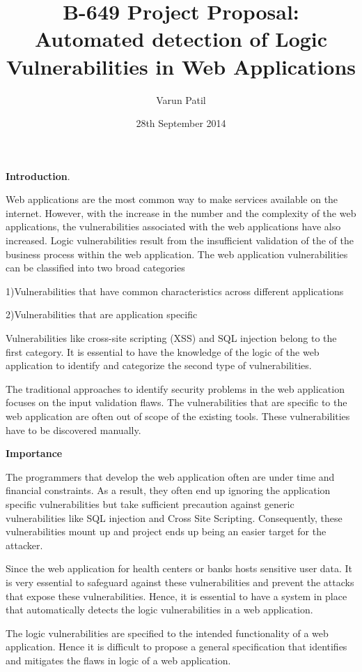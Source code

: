 \documentclass[11pt]{article}
\title{B-649 Project Proposal: Automated detection of Logic Vulnerabilities in Web Applications}
\author{Varun Patil}
\date{28th September 2014}
\begin{document}
\maketitle


\textbf{Introduction}.

Web applications are the most common way to make services available on the internet. However, with the increase in the number and the complexity of the web applications, the vulnerabilities associated with the web applications have also increased. Logic vulnerabilities result from the insufficient validation of the of the business process within the web application. The web application vulnerabilities can be classified into two broad categories

1)Vulnerabilities that have common characteristics across different applications

2)Vulnerabilities that are application specific

Vulnerabilities like cross-site scripting (XSS) and SQL injection belong to the first category. It is essential to have the knowledge of the logic of the web application to identify and categorize the second type of vulnerabilities.

The traditional approaches to identify security problems in the web application focuses on the input validation flaws. The vulnerabilities that are specific to the web application are often out of scope of the existing tools. These vulnerabilities have to be discovered manually.



\textbf{Importance}

The programmers that develop the web application often are under time and financial constraints. As a result, they often end up ignoring the application specific vulnerabilities but take sufficient precaution against generic vulnerabilities like SQL injection and Cross Site Scripting. Consequently, these vulnerabilities mount up and project ends up being an easier target for the attacker.

Since the web application for health centers or banks hosts sensitive user data. It is very essential to safeguard against these vulnerabilities and prevent the attacks that expose these vulnerabilities. Hence,  it is essential to have a system in place that automatically detects the logic vulnerabilities in a web application.

The logic vulnerabilities are specified to the intended functionality of a web application. Hence it is difficult to propose a general specification that identifies and mitigates the flaws in logic of a web application.
\end{document}
